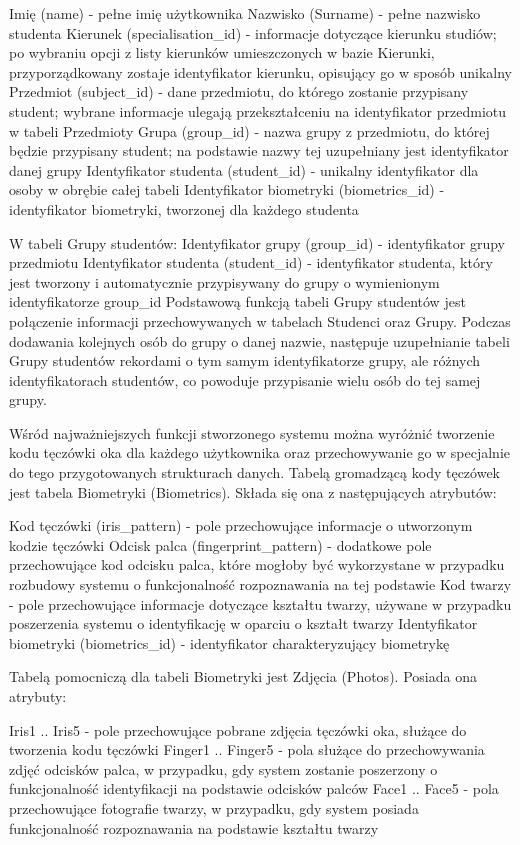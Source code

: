 Imię (name) - pełne imię użytkownika
Nazwisko (Surname) - pełne nazwisko studenta
Kierunek (specialisation\_id) - informacje dotyczące kierunku studiów; po wybraniu opcji z listy kierunków umieszczonych w bazie Kierunki, przyporządkowany zostaje identyfikator kierunku, opisujący go w sposób unikalny
Przedmiot (subject\_id) - dane przedmiotu, do którego zostanie przypisany student; wybrane informacje ulegają przekształceniu na identyfikator przedmiotu w tabeli Przedmioty
Grupa (group\_id) - nazwa grupy z przedmiotu, do której będzie przypisany student; na podstawie nazwy tej uzupełniany jest identyfikator danej grupy
Identyfikator studenta (student\_id) - unikalny identyfikator dla osoby w obrębie całej tabeli
Identyfikator biometryki (biometrics\_id) - identyfikator biometryki, tworzonej dla każdego studenta

W tabeli Grupy studentów:
Identyfikator grupy (group\_id) - identyfikator grupy przedmiotu
Identyfikator studenta (student\_id) - identyfikator studenta, który jest tworzony i automatycznie przypisywany do grupy o wymienionym identyfikatorze group\_id
Podstawową funkcją tabeli Grupy studentów jest połączenie informacji przechowywanych w tabelach Studenci oraz Grupy. Podczas dodawania kolejnych osób do grupy o danej nazwie, następuje uzupełnianie tabeli Grupy studentów rekordami o tym samym identyfikatorze grupy, ale różnych identyfikatorach studentów, co powoduje przypisanie wielu osób do tej samej grupy. 

Wśród najważniejszych funkcji stworzonego systemu można wyróżnić tworzenie kodu tęczówki oka dla każdego użytkownika oraz przechowywanie go w specjalnie do tego przygotowanych strukturach danych. Tabelą gromadzącą kody tęczówek jest tabela Biometryki (Biometrics). Składa się ona z następujących atrybutów:

Kod tęczówki (iris\_pattern) - pole przechowujące informacje o utworzonym kodzie tęczówki 
Odcisk palca (fingerprint\_pattern) - dodatkowe pole przechowujące kod odcisku palca, które mogłoby być wykorzystane w przypadku rozbudowy systemu o funkcjonalność rozpoznawania na tej podstawie
Kod twarzy - pole przechowujące informacje dotyczące kształtu twarzy, używane w przypadku poszerzenia systemu o identyfikację w oparciu o kształt twarzy
Identyfikator biometryki (biometrics\_id) - identyfikator charakteryzujący biometrykę

Tabelą pomocniczą dla tabeli Biometryki jest Zdjęcia (Photos). Posiada ona atrybuty:

Iris1 .. Iris5 - pole przechowujące pobrane zdjęcia tęczówki oka, służące do tworzenia kodu tęczówki
Finger1 .. Finger5 - pola służące do przechowywania zdjęć odcisków palca, w przypadku, gdy system zostanie poszerzony o funkcjonalność identyfikacji na podstawie odcisków palców
Face1 .. Face5 - pola przechowujące fotografie twarzy, w przypadku, gdy system posiada funkcjonalność rozpoznawania na podstawie kształtu twarzy

